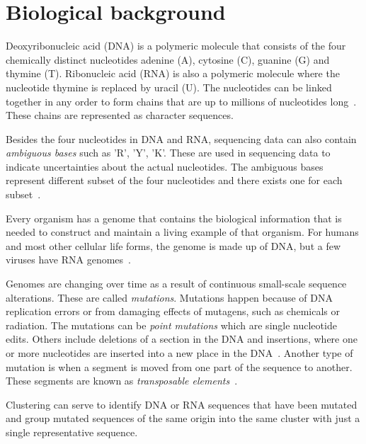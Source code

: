 \section{Biological background}
\label{sec:biology}

Deoxyribonucleic acid (DNA) is a polymeric molecule that consists of the four
chemically distinct nucleotides adenine (A), cytosine (C), guanine (G) and
thymine (T). Ribonucleic acid (RNA) is also a polymeric molecule where the
nucleotide thymine is replaced by uracil (U). The nucleotides can be linked
together in any order to form chains that are up to millions of nucleotides
long~\cite[pp.~8--9]{brown}. These chains are represented as character
sequences.

Besides the four nucleotides in DNA and RNA, sequencing data can also contain
\emph{ambiguous bases} such as 'R', 'Y', 'K'. These are used in sequencing data
to indicate uncertainties about the actual nucleotides. The ambiguous bases
represent different subset of the four nucleotides and there exists one for
each subset~\cite{tao}.

Every organism has a genome that contains the biological information that is
needed to construct and maintain a living example of that organism. For humans
and most other cellular life forms, the genome is made up of DNA, but a few
viruses have RNA genomes~\cite[pp.~3--4]{brown}.

Genomes are changing over time as a result of continuous small-scale sequence
alterations. These are called \textit{mutations}. Mutations happen because of
DNA replication errors or from damaging effects of mutagens, such as chemicals
or radiation. The mutations can be \textit{point mutations} which are single
nucleotide edits. Others include deletions of a section in the DNA and
insertions, where one or more nucleotides are inserted into a new place in the
DNA~\cite[pp.~505--506]{brown}. Another type of mutation is when a segment is
moved from one part of the sequence to another. These segments are known as
\emph{transposable elements}~\cite{munoz}.

Clustering can serve to identify DNA or RNA sequences that have been mutated and
group mutated sequences of the same origin into the same cluster with just a
single representative sequence.
